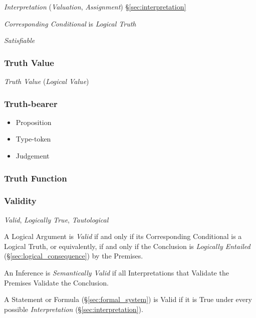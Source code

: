 \emph{Interpretation} (\emph{Valuation}, \emph{Assignment})
\S\ref{sec:interpretation}

\emph{Corresponding Conditional} is \emph{Logical Truth}

\emph{Satisfiable}



\subsubsection{Truth Value}\label{sec:truth_value}

\emph{Truth Value} (\emph{Logical Value})



\subsubsection{Truth-bearer}\label{sec:truth_bearer}

\begin{itemize}
\item Proposition
\item Type-token
\item Judgement
\end{itemize}



\subsubsection{Truth Function}\label{sec:truth_function}



\subsubsection{Validity}\label{sec:validity}

\emph{Valid}, \emph{Logically True}, \emph{Tautological}

A Logical Argument is \emph{Valid} if and only if its Corresponding
Conditional is a Logical Truth, or equivalently, if and only if the
Conclusion is \emph{Logically Entailed}
(\S\ref{sec:logical_consequence}) by the Premises.

An Inference is \emph{Semantically Valid} if all Interpretations that
Validate the Premises Validate the Conclusion.

A Statement or Formula (\S\ref{sec:formal_system}) is Valid if it is
True under every possible \emph{Interpretation}
(\S\ref{sec:interpretation}).



